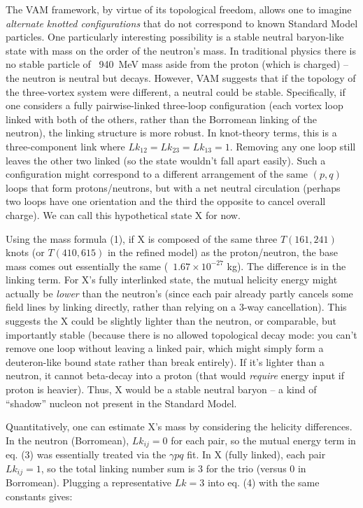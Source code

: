 The VAM framework, by virtue of its topological freedom, allows one to imagine \textit{alternate knotted configurations} that do not correspond to known Standard Model particles. One particularly interesting possibility is a stable neutral baryon-like state with mass on the order of the neutron’s mass. In traditional physics there is no stable particle of ~940 MeV mass aside from the proton (which is charged) – the neutron is neutral but decays. However, VAM suggests that if the topology of the three-vortex system were different, a neutral could be stable. Specifically, if one considers a fully pairwise-linked three-loop configuration (each vortex loop linked with both of the others, rather than the Borromean linking of the neutron), the linking structure is more robust. In knot-theory terms, this is a three-component link where $Lk_{12}=Lk_{23}=Lk_{13}=1$. Removing any one loop still leaves the other two linked (so the state wouldn’t fall apart easily). Such a configuration might correspond to a different arrangement of the same $(p,q)$ loops that form protons/neutrons, but with a net neutral circulation (perhaps two loops have one orientation and the third the opposite to cancel overall charge). We can call this hypothetical state X for now.


Using the mass formula (1), if X is composed of the same three $T(161,241)$ knots (or $T(410,615)$ in the refined model) as the proton/neutron, the base mass comes out essentially the same (~$1.67\times10^{-27}$ kg). The difference is in the linking term. For X’s fully interlinked state, the mutual helicity energy might actually be \textit{lower} than the neutron’s (since each pair already partly cancels some field lines by linking directly, rather than relying on a 3-way cancellation). This suggests the X could be slightly lighter than the neutron, or comparable, but importantly stable (because there is no allowed topological decay mode: you can’t remove one loop without leaving a linked pair, which might simply form a deuteron-like bound state rather than break entirely). If it’s lighter than a neutron, it cannot beta-decay into a proton (that would \textit{require} energy input if proton is heavier). Thus, X would be a stable neutral baryon – a kind of “shadow” nucleon not present in the Standard Model.


Quantitatively, one can estimate X’s mass by considering the helicity differences. In the neutron (Borromean), $Lk_{ij}=0$ for each pair, so the mutual energy term in eq. (3) was essentially treated via the $\gamma p q$ fit. In X (fully linked), each pair $Lk_{ij}=1$, so the total linking number sum is 3 for the trio (versus 0 in Borromean). Plugging a representative $Lk=3$ into eq. (4) with the same constants gives:

